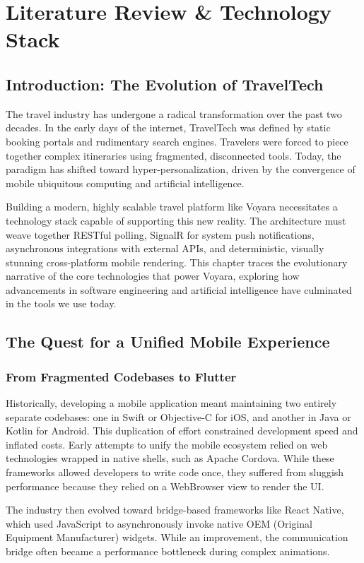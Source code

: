 \chapter{Literature Review \& Technology Stack}

\section{Introduction: The Evolution of TravelTech}
The travel industry has undergone a radical transformation over the past two decades. In the early days of the internet, TravelTech was defined by static booking portals and rudimentary search engines. Travelers were forced to piece together complex itineraries using fragmented, disconnected tools. Today, the paradigm has shifted toward hyper-personalization, driven by the convergence of mobile ubiquitous computing and artificial intelligence. 

Building a modern, highly scalable travel platform like Voyara necessitates a technology stack capable of supporting this new reality. The architecture must weave together RESTful polling, SignalR for system push notifications, asynchronous integrations with external APIs, and deterministic, visually stunning cross-platform mobile rendering. This chapter traces the evolutionary narrative of the core technologies that power Voyara, exploring how advancements in software engineering and artificial intelligence have culminated in the tools we use today.

\section{The Quest for a Unified Mobile Experience}
\subsection{From Fragmented Codebases to Flutter}
Historically, developing a mobile application meant maintaining two entirely separate codebases: one in Swift or Objective-C for iOS, and another in Java or Kotlin for Android. This duplication of effort constrained development speed and inflated costs. Early attempts to unify the mobile ecosystem relied on web technologies wrapped in native shells, such as Apache Cordova. While these frameworks allowed developers to write code once, they suffered from sluggish performance because they relied on a WebBrowser view to render the UI.

The industry then evolved toward bridge-based frameworks like React Native, which used JavaScript to asynchronously invoke native OEM (Original Equipment Manufacturer) widgets. While an improvement, the communication bridge often became a performance bottleneck during complex animations. 

